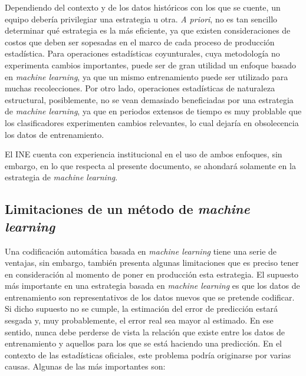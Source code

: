 \documentclass[
  12pt,
  spanish,
]{article}
\begin{document}
Dependiendo del contexto y de los datos históricos con los que se
cuente, un equipo debería privilegiar una estrategia u otra. \emph{A
priori}, no es tan sencillo determinar qué estrategia es la más
eficiente, ya que existen consideraciones de costos que deben ser
sopesadas en el marco de cada proceso de producción estadística. Para
operaciones estadísticas coyunturales, cuya metodología no experimenta
cambios importantes, puede ser de gran utilidad un enfoque basado en
\emph{machine learning}, ya que un mismo entrenamiento puede ser
utilizado para muchas recolecciones. Por otro lado, operaciones
estadísticas de naturaleza estructural, posiblemente, no se vean
demasiado beneficiadas por una estrategia de \emph{machine learning}, ya
que en periodos extensos de tiempo es muy problable que los
clasificadores experimenten cambios relevantes, lo cual dejaría en
obsolecencia los datos de entrenamiento.

El INE cuenta con experiencia institucional en el uso de ambos enfoques,
sin embargo, en lo que respecta al presente documento, se ahondará
solamente en la estrategia de \emph{machine learning}.

\hypertarget{limitaciones-de-un-muxe9todo-de-machine-learning}{%
\subsection{\texorpdfstring{Limitaciones de un método de \emph{machine
learning}}{Limitaciones de un método de machine learning}}\label{limitaciones-de-un-muxe9todo-de-machine-learning}}

Una codificación automática basada en \emph{machine learning} tiene una
serie de ventajas, sin embargo, también presenta algunas limitaciones
que es preciso tener en consideración al momento de poner en producción
esta estrategia. El supuesto más importante en una estrategia basada en
\emph{machine learning} es que los datos de entrenamiento son
representativos de los datos nuevos que se pretende codificar. Si dicho
supuesto no se cumple, la estimación del error de predicción estará
sesgada y, muy probablemente, el error real sea mayor al estimado. En
ese sentido, nunca debe perderse de vista la relación que existe entre
los datos de entrenamiento y aquellos para los que se está haciendo una
predicción. En el contexto de las estadísticas oficiales, este problema
podría originarse por varias causas. Algunas de las más importantes son:
\end{document}
